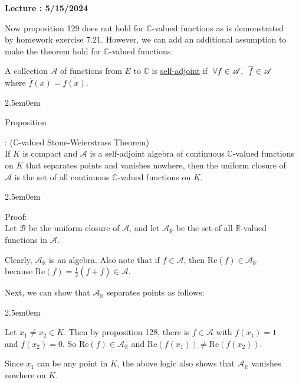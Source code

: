 \documentclass{book}
\newcommand{\hTwo}{%
   \color{MidnightBlue}%
   \fontsize{13}{15}\selectfont%
}
\newcommand{\hThree}{%
   \color{PineGreen!85!Orange}
   \fontsize{13}{15}\selectfont%
}
\newcommand{\hFour}{%
   \color{Cerulean}
   \fontsize{12}{14}\selectfont%
}
\newenvironment{myIndent}{%
   \begin{adjustwidth}{2.5em}{0em}%
}{%
   \end{adjustwidth}%
}
\newcommand{\udefine}[1]{{%
   \setulcolor{Red}%
   \setul{0.14em}{0.07em}%
   \ul{#1}%
}}
\newcommand{\rea}[1]{\mathrm{Re}(#1)}
\newcommand{\ima}[1]{\mathrm{Im}(#1)}
\newcommand{\myHS}{ \hspace{0.5em}}
\newcounter{PropNumber}
\newcommand{\propCount}[1][1]{%
   \addtocounter{PropNumber}{#1}%
   \thePropNumber%
}
\newcommand{\retTwo}{\hfill\bigbreak}
\newcounter{LectureNumber}
\newcommand*{\markLecture}[1]{%
   \stepcounter{LectureNumber}%
   {\huge \color{Black} \textbf{Lecture \theLectureNumber: #1} \newline}%
}
\begin{document}
\newpage

\markLecture{5/15/2024}

Now proposition 129 does not hold for $\mathbb{C}$-valued functions as is demonstrated\\ by homework exercise 7.21. However, we can add an additional assumption to\\ make the theorem hold for $\mathbb{C}$-valued functions.\retTwo

A collection $\mathscr{A}$ of functions from $E$ to $\mathbb{C}$ is \udefine{self-adjoint} if $\hspace{0.2em}\forall f \in \mathscr{A}, \myHS \overline{f} \in \mathscr{A}$\\ where $\overline{f}(x) = \overline{f(x)}$.\retTwo


{\begin{myIndent}\hTwo
   Proposition \propCount: ($\mathbb{C}$-valued Stone-Weierstrass Theorem)\\ If $K$ is compact and $\mathscr{A}$ is a self-adjoint algebra of continuous $\mathbb{C}$-valued functions\\ on $K$ that separates points and vanishes nowhere, then the uniform closure of\\ $\mathscr{A}$ is the set of all continuous $\mathbb{C}$-valued functions on $K$.\\ [-6pt]

   {\begin{myIndent}\hThree
      Proof:\\
      Let $\mathscr{B}$ be the uniform closure of $\mathscr{A}$, and let $\mathscr{A}_{\mathbb{R}}$ be the set of all $\mathbb{R}$-valued\\ functions in $\mathscr{A}$.\retTwo

      Clearly, $\mathscr{A}_\mathbb{R}$ is an algebra. Also note that if $f \in \mathscr{A}$, then $\rea{f} \in \mathscr{A}_{\mathbb{R}}$\\ because $\rea{f} = \frac{1}{2}(f + \overline{f}) \in \mathscr{A}$.\retTwo %
      
      Next, we can show that $\mathscr{A}_{\mathbb{R}}$ separates points as follows:

      {\begin{myIndent}\hFour
         Let $x_1 \neq x_2 \in K$. Then by proposition 128, there is $f \in \mathscr{A}$ with $f(x_1) = 1$\\ and $f(x_2) = 0$. So $\rea{f} \in \mathscr{A}_{\mathbb{R}}$ and $\rea{f(x_1)} \neq \rea{f(x_2)}$.\retTwo
      \end{myIndent}}

      Since $x_1$ can be any point in $K$, the above logic also shows that $\mathscr{A}_{\mathbb{R}}$ vanishes nowhere on $K$. 

   \end{myIndent}}
\end{myIndent}}
\end{document}
